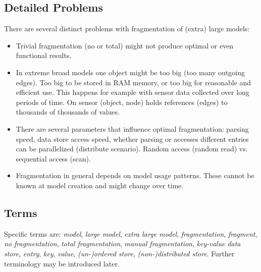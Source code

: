 \subsection{Detailed Problems}

There are several distinct problems with fragmentation of (extra) large models:
\begin{itemize}
\item Trivial fragmentation (no or total) might not produce optimal or even functional results. 

\item In extreme broad models one object might be too big (too many outgoing edges). Too big to be stored in RAM memory, or too big for reasonable and efficient use. This happens for example with sensor data collected over long periods of time. On sensor (object, node) holds references (edges) to thousands of thousands of values.  

\item There are several parameters that influence optimal fragmentation: parsing speed, data store access speed, whether parsing or accesses different entries can be parallelized (distribute scenario). Random access (random read) vs. sequential access (scan). 

\item Fragmentation in general depends on model usage patterns. These cannot be known at model creation and might change over time.
\end{itemize}

\subsection{Terms}

Specific terms are: \emph{model}, \emph{large model}, \emph{extra large model}, \emph{fragmentation}, \emph{fragment}, \emph{no fragmentation}, \emph{total fragmentation}, \emph{manual fragmentation}, \emph{key-value data store}, \emph{entry}, \emph{key}, \emph{value}, \emph{(un-)ordered store}, \emph{(non-)distributed store}. Further terminology may be introduced later.

